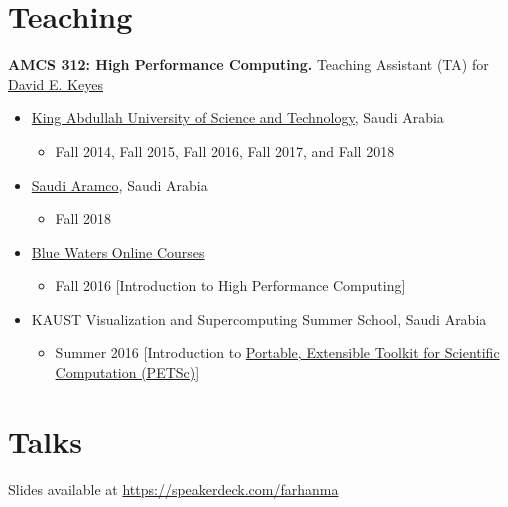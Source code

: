 \documentclass[margin]{resume2}
\begin{document}
\begin{resume}
    \section{Teaching} {\bf AMCS 312: High Performance Computing.} Teaching Assistant (TA) for
    \href{https://www.kaust.edu.sa/en/study/faculty/david-keyes}{David E. Keyes}\\
      \begin{itemize}
        \item
        \href{https://www.kaust.edu.sa/en}{King Abdullah University of Science and Technology}, Saudi Arabia
        \begin{itemize}
          \item
          Fall 2014, Fall 2015,  Fall 2016,  Fall 2017, and Fall 2018
        \end{itemize}
        \item
        \href{https://www.saudiaramco.com/}{Saudi Aramco}, Saudi Arabia
        \begin{itemize}
          \item
          Fall 2018
        \end{itemize}
        \item
        \href{https://bw-course.ncsa.illinois.edu/}{Blue Waters Online Courses}
        \begin{itemize}
          \item
          Fall 2016 [Introduction to High Performance Computing]
        \end{itemize}
        \item
        KAUST Visualization and Supercomputing Summer School, Saudi Arabia
        \begin{itemize}
          \item
          Summer 2016 [Introduction to
          \href{https://www.mcs.anl.gov/petsc/}{
          Portable, Extensible Toolkit for Scientific Computation (PETSc)}]
        \end{itemize}
      \end{itemize}

    \section{Talks} Slides available at \url{https://speakerdeck.com/farhanma}\\


\end{resume}
\end{document}
